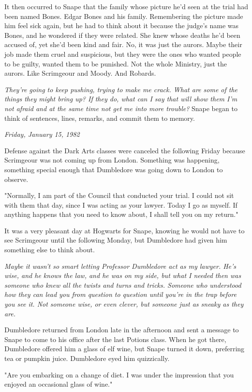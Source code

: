\documentclass[a4paper,11pt]{article}
\begin{document}
It then occurred to Snape that the family whose picture he'd seen at the trial had been named Bones. Edgar Bones and his family. Remembering the picture made him feel sick again, but he had to think about it because the judge's name was Bones, and he wondered if they were related. She knew whose deaths he'd been accused of, yet she'd been kind and fair. No, it was just the aurors. Maybe their job made them cruel and suspicious, but they were the ones who wanted people to be guilty, wanted them to be punished. Not the whole Ministry, just the aurors. Like Scrimgeour and Moody. And Robards.

\emph{They're going to keep pushing, trying to make me crack. What are some of the things they might bring up? If they do, what can I say that will show them I'm not afraid and at the same time not get me into more trouble?} Snape began to think of sentences, lines, remarks, and commit them to memory.

\emph{Friday, January 15, 1982}

Defense against the Dark Arts classes were canceled the following Friday because Scrimgeour was not coming up from London. Something was happening, something special enough that Dumbledore was going down to London to observe.

"Normally, I am part of the Council that conducted your trial. I could not sit with them that day, since I was acting as your lawyer. Today I go as myself. If anything happens that you need to know about, I shall tell you on my return."

It was a very pleasant day at Hogwarts for Snape, knowing he would not have to see Scrimgeour until the following Monday, but Dumbledore had given him something else to think about.

\emph{Maybe it wasn't so smart letting Professor Dumbledore act as my lawyer. He's wise, and he knows the law, and he was on my side, but what I needed then was someone who knew all the twists and turns and tricks. Someone who understood how they can lead you from question to question until you're in the trap before you see it. Not someone wise, or even clever, but someone just as sneaky as they are.}

Dumbledore returned from London late in the afternoon and sent a message to Snape to come to his office after the last Potions class. When he got there, Dumbledore offered him a glass of elf wine, but Snape turned it down, preferring tea or pumpkin juice. Dumbledore eyed him quizzically.

"Are you embarking on a change of diet. I was under the impression that you enjoyed an occasional glass of wine."
\end{document}
